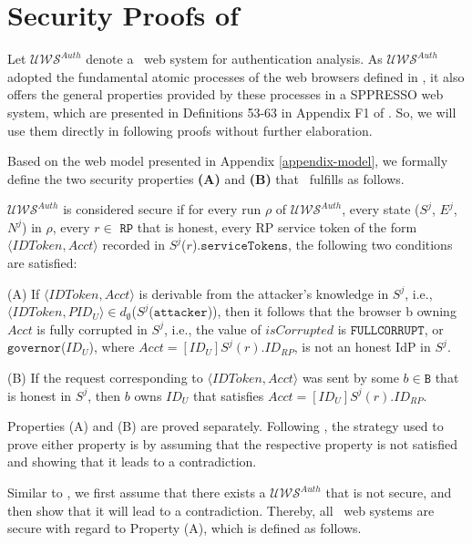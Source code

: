 \section{Security Proofs of \usso}
\label{appendix-security}

Let  $\mathcal{U\!W\!S}^{Auth}$ denote a \usso\ web system for authentication analysis. As $\mathcal{U\!W\!S}^{Auth}$ adopted the fundamental atomic processes of the web browsers defined in \cite{SPRESSO}, it also offers the general properties provided by these processes in a SPPRESSO web system, which are presented in Definitions 53-63 in Appendix F1 of \cite{SPRESSO}. So, we will use them directly in following proofs without further elaboration.

Based on the web model presented in Appendix \ref{appendix-model}, we formally define the two security properties {\bf (A)} and {\bf (B)} that \usso\ fulfills as follows. 

\begin{definition}
$\mathcal{U\!W\!S}^{Auth}$ is considered secure if for every run $\rho$ of $\mathcal{U\!W\!S}^{Auth}$, every state ($S^j$, $E^j$, $N^j$) in $\rho$, every $r \in$ $\mathtt{RP}$ that is honest, every RP service token of the form $\langle IDToken, Acct \rangle$ recorded in $S^j$($r$).$\mathtt{serviceTokens}$, the following two conditions are satisfied:

(A) If $\langle IDToken, Acct\rangle$ is derivable from the attacker's knowledge in $S^j$, i.e., $\langle IDToken, PID_U \rangle \in d_{\emptyset}$($S^j$($\mathtt{attacker}$)), then it follows that the browser b owning $Acct$ is fully corrupted in $S^j$, i.e., the value of $isCorrupted$ is $\mathtt{FULLCORRUPT}$, or $\mathtt{governor}$($ID_U$), where $Acct=[ID_U]S^j(r).ID_{RP}$, is not an honest IdP in $S^j$.

(B) If the request corresponding to $\langle IDToken, Acct \rangle$ was sent by some $b \in \mathtt{B}$ that is honest in $S^j$, then $b$ owns $ID_U$ that satisfies $Acct=[ID_U]S^j(r).ID_{RP}$.
\end{definition}

Properties (A) and (B) are proved separately. Following \cite{SPRESSO}, the strategy used to prove either property is by assuming that the respective property is not satisfied and showing that it leads to a contradiction.

\vspace{1mm} 
Similar to \cite{SPRESSO}, we first assume that there exists a $\mathcal{U\!W\!S}^{Auth}$ that is not secure, and then show that it will lead to a contradiction. Thereby, all \usso\ web systems are secure with regard to Property (A), which is defined as follows.

